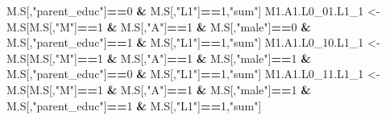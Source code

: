 \documentclass[
]{book}
\newenvironment{Shaded}{\begin{snugshade}}{\end{snugshade}}
\newcommand{\DecValTok}[1]{\textcolor[rgb]{0.00,0.00,0.81}{#1}}
\newcommand{\NormalTok}[1]{#1}
\newcommand{\OtherTok}[1]{\textcolor[rgb]{0.56,0.35,0.01}{#1}}
\newcommand{\SpecialCharTok}[1]{\textcolor[rgb]{0.81,0.36,0.00}{\textbf{#1}}}
\newcommand{\StringTok}[1]{\textcolor[rgb]{0.31,0.60,0.02}{#1}}
\begin{document}
\begin{Shaded}
\begin{Highlighting}[]
\NormalTok{                            M.S[,}\StringTok{"parent\_educ"}\NormalTok{]}\SpecialCharTok{==}\DecValTok{0} \SpecialCharTok{\&}\NormalTok{ M.S[,}\StringTok{"L1"}\NormalTok{]}\SpecialCharTok{==}\DecValTok{1}\NormalTok{,}\StringTok{"sum"}\NormalTok{]}
\NormalTok{  M1.A1.L0\_01.L1\_1 }\OtherTok{\textless{}{-}}\NormalTok{ M.S[M.S[,}\StringTok{"M"}\NormalTok{]}\SpecialCharTok{==}\DecValTok{1} \SpecialCharTok{\&}\NormalTok{ M.S[,}\StringTok{"A"}\NormalTok{]}\SpecialCharTok{==}\DecValTok{1} \SpecialCharTok{\&}\NormalTok{ M.S[,}\StringTok{"male"}\NormalTok{]}\SpecialCharTok{==}\DecValTok{0} \SpecialCharTok{\&} 
\NormalTok{                            M.S[,}\StringTok{"parent\_educ"}\NormalTok{]}\SpecialCharTok{==}\DecValTok{1} \SpecialCharTok{\&}\NormalTok{ M.S[,}\StringTok{"L1"}\NormalTok{]}\SpecialCharTok{==}\DecValTok{1}\NormalTok{,}\StringTok{"sum"}\NormalTok{]}
\NormalTok{  M1.A1.L0\_10.L1\_1 }\OtherTok{\textless{}{-}}\NormalTok{ M.S[M.S[,}\StringTok{"M"}\NormalTok{]}\SpecialCharTok{==}\DecValTok{1} \SpecialCharTok{\&}\NormalTok{ M.S[,}\StringTok{"A"}\NormalTok{]}\SpecialCharTok{==}\DecValTok{1} \SpecialCharTok{\&}\NormalTok{ M.S[,}\StringTok{"male"}\NormalTok{]}\SpecialCharTok{==}\DecValTok{1} \SpecialCharTok{\&} 
\NormalTok{                            M.S[,}\StringTok{"parent\_educ"}\NormalTok{]}\SpecialCharTok{==}\DecValTok{0} \SpecialCharTok{\&}\NormalTok{ M.S[,}\StringTok{"L1"}\NormalTok{]}\SpecialCharTok{==}\DecValTok{1}\NormalTok{,}\StringTok{"sum"}\NormalTok{]}
\NormalTok{  M1.A1.L0\_11.L1\_1 }\OtherTok{\textless{}{-}}\NormalTok{ M.S[M.S[,}\StringTok{"M"}\NormalTok{]}\SpecialCharTok{==}\DecValTok{1} \SpecialCharTok{\&}\NormalTok{ M.S[,}\StringTok{"A"}\NormalTok{]}\SpecialCharTok{==}\DecValTok{1} \SpecialCharTok{\&}\NormalTok{ M.S[,}\StringTok{"male"}\NormalTok{]}\SpecialCharTok{==}\DecValTok{1} \SpecialCharTok{\&} 
\NormalTok{                            M.S[,}\StringTok{"parent\_educ"}\NormalTok{]}\SpecialCharTok{==}\DecValTok{1} \SpecialCharTok{\&}\NormalTok{ M.S[,}\StringTok{"L1"}\NormalTok{]}\SpecialCharTok{==}\DecValTok{1}\NormalTok{,}\StringTok{"sum"}\NormalTok{]}
  

\end{Highlighting}
\end{Shaded}
\end{document}
